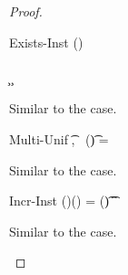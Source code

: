 \documentclass[acmsmall,screen,nonacm%
\Anonymous{,anonymous}{}%
\Final{}{,review}%
]{acmart}
\begin{document}
\begin{theorem}[Canonicalization]
\begin{proof}
\begin{proofcases}
    \proofcasederivation
      {Exists-Inst}
      {\greg \wild \semenvp \in \semenv(\x) \\\\
       \semenv\where{\inst \is \semenvp} \th \c}
      {\semenv \th \cexistsi \inst \x \c}

      \begin{llproof}
	Similar to the  case.
      \end{llproof}


    \proofcasederivation
      {Multi-Unif}
      {\forall \t \in \ueq,~ \semenv(\t) = \gt}
      {\semenv \th \ueq}

      \begin{llproof}
	Similar to the  case.
      \end{llproof}

    \proofcasederivation
      {Incr-Inst}
      {\semenv(\inst)(\tv) = \semenv(\t)}
      {\semenv \th \cpinst \inst \tv \t}


      \begin{llproof}
	Similar to the  case.
      \end{llproof}


  \end{proofcases}
  \end{proof}
\end{theorem}
\end{document}
